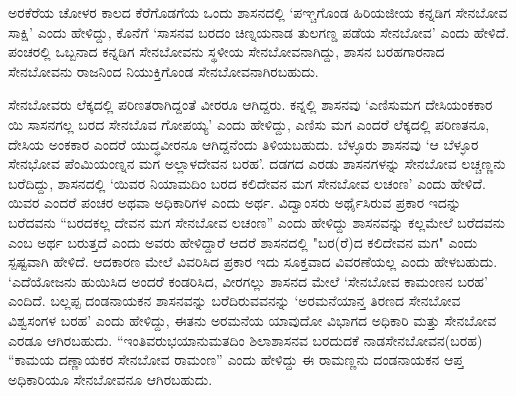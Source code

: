 ಅರಕೆರೆಯ ಚೋಳರ ಕಾಲದ ಕೆರೆಗೊಡಗೆಯ ಒಂದು ಶಾಸನದಲ್ಲಿ ‘ಪಞ್ಚಗೊಂಡ ಹಿರಿಯಜೀಯ ಕನ್ನಡಿಗ ಸೇನಬೋವ ಸಾಕ್ಷಿ’ ಎಂದು ಹೇಳಿದ್ದು, ಕೊನೆಗೆ ‘ಸಾಸನವ ಬರದಂ ಚಿಣ್ನಯನಾಡ ತುಲಗಣ್ಡ ಪಡೆಯ ಸೇನಬೋವ’ ಎಂದು ಹೇಳಿದೆ. ಪಂಚರಲ್ಲಿ ಒಬ್ಬನಾದ ಕನ್ನಡಿಗ ಸೇನಬೋವನು ಸ್ಥಳೀಯ ಸೇನಬೋವನಾಗಿದ್ದು, ಶಾಸನ ಬರಹಗಾರನಾದ ಸೇನಬೋವನು ರಾಜನಿಂದ ನಿಯುಕ್ತಿಗೊಂಡ ಸೇನಬೋವನಾಗಿರಬಹುದು.

ಸೇನಬೋವರು ಲೆಕ್ಕದಲ್ಲಿ ಪರಿಣತರಾಗಿದ್ದಂತೆ ವೀರರೂ ಆಗಿದ್ದರು. ಕನ್ನಲ್ಲಿ ಶಾಸನವು ‘ಎಣಿಸುಮಗ ದೇಸಿಯಂಕಕಾರ ಯಿ ಸಾಸನಗಲ್ಲ ಬರದ ಸೇನಬೊವ ಗೋಪಯ್ಯ’ ಎಂದು ಹೇಳಿದ್ದು, ಎಣಿಸು ಮಗ ಎಂದರೆ ಲೆಕ್ಕದಲ್ಲಿ ಪರಿಣತನೂ, ದೇಸಿಯ ಅಂಕಕಾರ ಎಂದರೆ ಯುದ್ಧವೀರನೂ ಆಗಿದ್ದನೆಂದು ತಿಳಿಯಬಹುದು. ಬೆಳ್ಳೂರು ಶಾಸನವು ‘ಆ ಬೆಳ್ಳೂರ ಸೇನಭೋವ ಪೆಂಮಿಯಂಣ್ನನ ಮಗ ಅಲ್ಲಾಳದೇವನ ಬರಹ’. ದಡಗದ ಎರಡು ಶಾಸನಗಳನ್ನು ಸೇನಬೋವ ಲಚ್ಚಣ್ಣನು ಬರೆದಿದ್ದು, ಶಾಸನದಲ್ಲಿ ‘ಯಿವರ ನಿಯಾಮದಿಂ ಬರದ ಕಲಿದೇವನ ಮಗ ಸೇನಬೋವ ಲಚಂಣ’ ಎಂದು ಹೇಳಿದೆ. ಯಿವರ ಎಂದರೆ ಪಂಚರ ಅಥವಾ ಅಧಿಕಾರಿಗಳ ಎಂದು ಅರ್ಥ. ವಿದ್ವಾಂಸರು ಅರ್ಥೈಸಿರುವ ಪ್ರಕಾರ ಇದನ್ನು ಬರೆದವನು “ಬರದಕಲ್ಲ ದೇವನ ಮಗ ಸೇನಬೋವ ಲಚಂಣ” ಎಂದು ಹೇಳಿದ್ದು ಶಾಸನವನ್ನು ಕಲ್ಲಮೇಲೆ ಬರೆದವನು ಎಂಬ ಅರ್ಥ ಬರುತ್ತದೆ ಎಂದು ಅವರು ಹೇಳಿದ್ದಾರೆ ಆದರೆ ಶಾಸನದಲ್ಲಿ "ಬರ(ರೆ)ದ ಕಲಿದೇವನ ಮಗ" ಎಂದು ಸ್ಪಷ್ಟವಾಗಿ ಹೇಳಿದೆ. ಆದಕಾರಣ ಮೇಲೆ ವಿವರಿಸಿದ ಪ್ರಕಾರ ಇದು ಸೂಕ್ತವಾದ ವಿವರಣೆಯಲ್ಲ ಎಂದು ಹೇಳಬಹುದು. ‘ಎದೆಯೋಜನು ಹುಯಿಸಿದ ಅಂದರೆ ಕಂಡರಿಸಿದ, ವೀರಗಲ್ಲು ಶಾಸನದ ಮೇಲೆ ‘ಸೇನಬೋವ ಕಾಮಂಣನ ಬರಹ’ ಎಂದಿದೆ. ಬಲ್ಲಪ್ಪ ದಂಡನಾಯಕನ ಶಾಸನವನ್ನು ಬರೆದಿರುವವನನ್ನು ‘ಅರಮನೆಯಾನ್ತ ತಿರಣದ ಸೇನಬೋವ ವಿಶ್ವಸಂಗಳ ಬರಹ’ ಎಂದು ಹೇಳಿದ್ದು, ಈತನು ಅರಮನೆಯ ಯಾವುದೋ ವಿಭಾಗದ ಅಧಿಕಾರಿ ಮತ್ತು ಸೇನಬೋವ ಎರಡೂ ಆಗಿರಬಹುದು. “ಇಂತಿವರುಭಯಾನುಮತದಿಂ ಶಿಲಾಶಾಸನವ ಬರದುದಕೆ ನಾಡಸೇನಬೋವನ(ಬರಹ) “ಕಾಮಯ ದಣ್ಣಾಯಕರ ಸೇನಬೋವ ರಾಮಂಣ” ಎಂದು ಹೇಳಿದ್ದು ಈ ರಾಮಣ್ಣನು ದಂಡನಾಯಕನ ಆಪ್ತ ಅಧಿಕಾರಿಯೂ ಸೇನಬೋವನೂ ಆಗಿರಬಹುದು.


